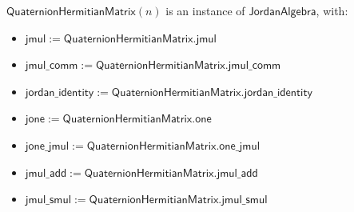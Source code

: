\begin{proposition}[jordanAlgebraQuaternionHermitianMatrix]
$\mathsf{QuaternionHermitianMatrix}(n)$ is an instance of $\mathsf{JordanAlgebra}$, with:
\begin{itemize}
  \item $\mathsf{jmul} := \mathsf{QuaternionHermitianMatrix.jmul}$
  \item $\mathsf{jmul\_comm} := \mathsf{QuaternionHermitianMatrix.jmul\_comm}$
  \item $\mathsf{jordan\_identity} := \mathsf{QuaternionHermitianMatrix.jordan\_identity}$
  \item $\mathsf{jone} := \mathsf{QuaternionHermitianMatrix.one}$
  \item $\mathsf{jone\_jmul} := \mathsf{QuaternionHermitianMatrix.one\_jmul}$
  \item $\mathsf{jmul\_add} := \mathsf{QuaternionHermitianMatrix.jmul\_add}$
  \item $\mathsf{jmul\_smul} := \mathsf{QuaternionHermitianMatrix.jmul\_smul}$
\end{itemize}
\end{proposition}
